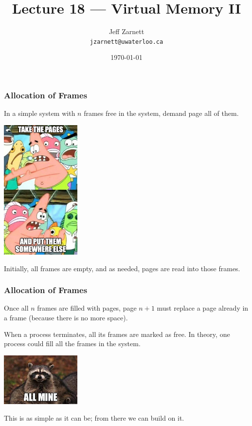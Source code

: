 

\title{Lecture 18 --- Virtual Memory II }

\author{Jeff Zarnett \\ \small \texttt{jzarnett@uwaterloo.ca}}
\date{\today}




\begin{frame}
  \titlepage

 \end{frame}


\begin{frame}
\frametitle{Allocation of Frames}

In a simple system with $n$ frames free in the system, demand page all of them. 



\begin{center}
	\includegraphics[width=0.3\textwidth]{images/pages-elsewhere.jpg}
\end{center}

Initially, all frames are empty, and as needed, pages are read into those frames. 

 \end{frame}


\begin{frame}
\frametitle{Allocation of Frames}

Once all $n$ frames are filled with pages, page $n+1$ must replace a page already in a frame (because there is no more space). 

When a process terminates, all its frames are marked as free. In theory, one process could fill all the frames in the system. 

\begin{center}
	\includegraphics[width=0.3\textwidth]{images/allmine.jpg}
\end{center}

This is as simple as it can be; from there we can build on it.


\end{frame}

